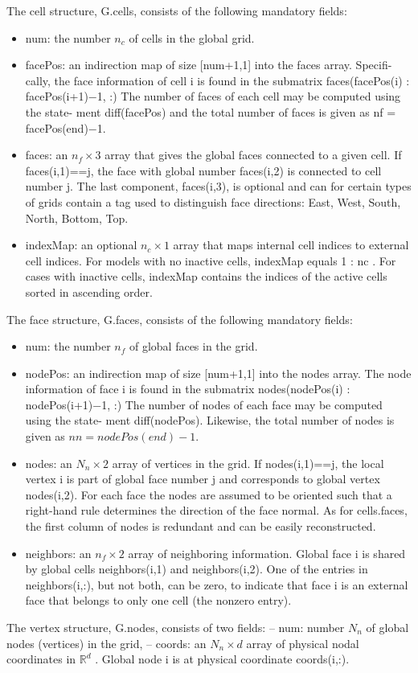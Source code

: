 \documentclass[a4paper,10pt]{report}
\begin{document}
The cell structure, G.cells, consists of the following mandatory fields:
\begin{itemize}
 \item num: the number $n_c$ of cells in the global grid.
\item facePos: an indirection map of size [num+1,1] into the faces array. Specifi-
cally, the face information of cell i is found in the submatrix
faces(facePos(i) : facePos(i+1)−1, :)
The number of faces of each cell may be computed using the state-
ment diff(facePos) and the total number of faces is given as nf =
facePos(end)−1.
\item  faces: an $n_f\times3$ array that gives the global faces connected to a given cell.
If faces(i,1)==j, the face with global number faces(i,2) is
connected to cell number j. The last component, faces(i,3), is optional
and can for certain types of grids contain a tag used to distinguish face
directions: East, West, South, North, Bottom, Top.
\item indexMap: an optional $n_c \times 1$ array that maps internal cell indices to external
cell indices. For models with no inactive cells, indexMap equals 1 : nc . For
cases with inactive cells, indexMap contains the indices of the active cells
sorted in ascending order. 
\end{itemize}
The face structure, G.faces, consists of the following mandatory fields:
\begin{itemize}
 \item num: the number $n_f$ of global faces in the grid.
 \item nodePos: an indirection map of size [num+1,1] into the nodes array. 
 The node information of face i is found in the submatrix
nodes(nodePos(i) : nodePos(i+1)−1, :)
The number of nodes of each face may be computed using the state-
ment diff(nodePos). Likewise, the total number of nodes is given as $nn =
nodePos(end)−1$.
\item nodes: an $N_n \times 2$ array of vertices in the grid. If nodes(i,1)==j, the local
vertex i is part of global face number j and corresponds to global vertex nodes(i,2). 
For each face the nodes are assumed to be oriented such
that a right-hand rule determines the direction of the face normal. As
for cells.faces, the first column of nodes is redundant and can be easily
reconstructed. 
\item  neighbors: an $n_f \times 2$ array of neighboring information. Global face i is
shared by global cells neighbors(i,1) and neighbors(i,2). One of the entries
in neighbors(i,:), but not both, can be zero, to indicate that face i is an
external face that belongs to only one cell (the nonzero entry).
\end{itemize}
The vertex structure, G.nodes, consists of two fields:
– num: number $N_n$ of global nodes (vertices) in the grid,
– coords: an $N_n \times d$ array of physical nodal coordinates in $\mathbb{R}^d$
. Global node i is at physical coordinate coords(i,:).
\end{document}
